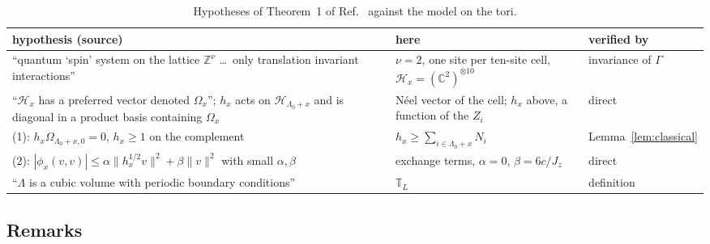 \documentclass[aps,prx,onecolumn,10pt,nofootinbib,longbibliography,floatfix]{revtex4-2}
\theoremstyle{remark}
\newcommand{\Jz}{J_z}
\begin{document}
\begin{table}[h]
\caption{Hypotheses of Theorem~1 of Ref.~\cite{yarotsky2006} against the model on the tori.} %
\label{tab:yar}
\begin{tabular}{p{}p{}p{}} %
hypothesis (source) & here & verified by\\ \hline
``quantum `spin' system on the lattice $\mathbb Z^\nu$ \dots\ only translation invariant interactions'' & $\nu=2$, one site per ten-site cell, $\mathcal H_x=(\mathbb C^2)^{\otimes10}$ & invariance of $\Gamma$\\
``$\mathcal H_x$ has a preferred vector denoted $\Omega_x$''; $h_x$ acts on $\mathcal H_{\Lambda_0+x}$ and is diagonal in a product basis containing $\Omega_x$ & N\'eel vector of the cell; $h_x$ above, a function of the $Z_i$ & direct\\
(1): $h_x\Omega_{\Lambda_0+x,0}=0$, $h_x\ge1$ on the complement & $h_x\ge\sum_{i\in\Lambda_0+x}N_i$ & Lemma~\ref{lem:classical}\\ %
(2): $|\phi_x(v,v)|\le\alpha\|h_x^{1/2}v\|^2+\beta\|v\|^2$ with small $\alpha,\beta$ & exchange terms, $\alpha=0$, $\beta=6c/\Jz$ & direct\\ %
``$\Lambda$ is a cubic volume with periodic boundary conditions'' & $\mathbb T_L$ & definition\\
\end{tabular}
\end{table}

\subsection{Remarks}
\label{sm:thm4-remarks}
\end{document}
